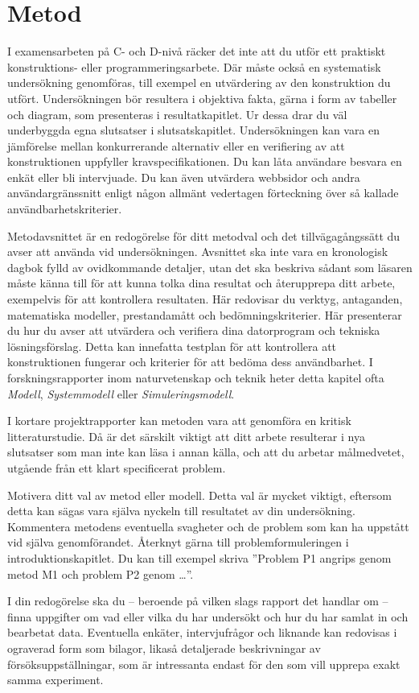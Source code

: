 \chapter{Metod}
\label{ch:methodology}
\noindent
I examensarbeten på C- och D-nivå räcker det inte att du utför ett praktiskt 
konstruktions- eller programmeringsarbete.
Där måste också en systematisk undersökning genomföras, till exempel en 
utvärdering av den konstruktion du utfört.
Undersökningen bör resultera i objektiva fakta, gärna i form av tabeller och 
diagram, som presenteras i resultatkapitlet.
Ur dessa drar du väl underbyggda egna slutsatser i slutsatskapitlet.
Undersökningen kan vara en jämförelse mellan konkurrerande alternativ eller en 
verifiering av att konstruktionen uppfyller kravspecifikationen.
Du kan låta användare besvara en enkät eller bli intervjuade.
Du kan även utvärdera webbsidor och andra användargränssnitt enligt någon 
allmänt vedertagen förteckning över så kallade användbarhetskriterier.

Metodavsnittet är en redogörelse för ditt metodval och det tillvägagångssätt du 
avser att använda vid undersökningen.
Avsnittet ska inte vara en kronologisk dagbok fylld av ovidkommande detaljer, 
utan det ska beskriva sådant som läsaren måste känna till för att kunna tolka 
dina resultat och återupprepa ditt arbete, exempelvis för att kontrollera 
resultaten.
Här redovisar du verktyg, antaganden, matematiska modeller, prestandamått och 
bedömningskriterier.
Här presenterar du hur du avser att utvärdera och verifiera dina datorprogram 
och tekniska lösningsförslag.
Detta kan innefatta testplan för att kontrollera att konstruktionen fungerar 
och kriterier för att bedöma dess användbarhet.
I forskningsrapporter inom naturvetenskap och teknik heter detta kapitel ofta 
\emph{Modell}, \emph{Systemmodell} eller \emph{Simuleringsmodell}.

I kortare projektrapporter kan metoden vara att genomföra en kritisk 
litteraturstudie.
Då är det särskilt viktigt att ditt arbete resulterar i nya slutsatser som man 
inte kan läsa i annan källa, och att du arbetar målmedvetet, utgående från ett 
klart specificerat problem.

Motivera ditt val av metod eller modell.
Detta val är mycket viktigt, eftersom detta kan sägas vara själva nyckeln till 
resultatet av din undersökning.
Kommentera metodens eventuella svagheter och de problem som kan ha uppstått vid 
själva genomförandet.
Återknyt gärna till problemformuleringen i introduktionskapitlet.
Du kan till exempel skriva ''Problem P1 angrips genom metod M1 och problem P2 
genom \dots''.

I din redogörelse ska du -- beroende på vilken slags rapport det handlar om -- 
finna uppgifter om vad eller vilka du har undersökt och hur du har samlat in 
och bearbetat data.
Eventuella enkäter, intervjufrågor och liknande kan redovisas i ograverad form 
som bilagor, likaså detaljerade beskrivningar av försöksuppställningar, som är 
intressanta endast för den som vill upprepa exakt samma experiment.
